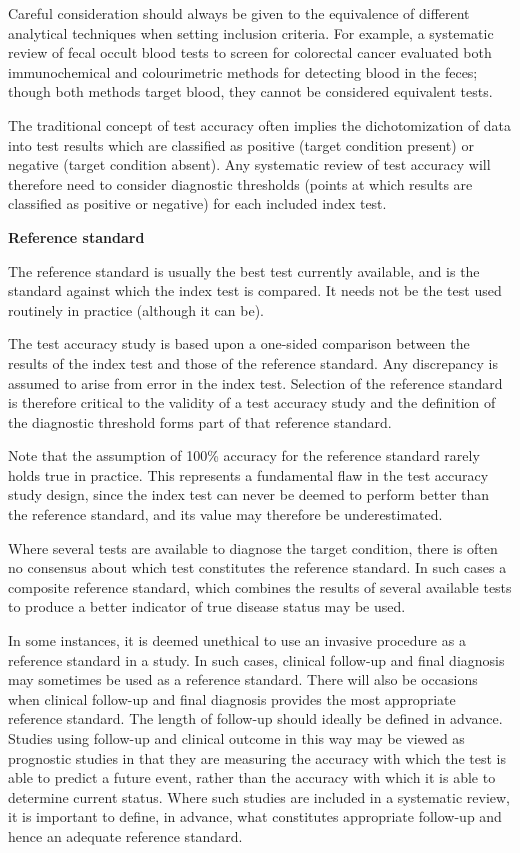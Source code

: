 \documentclass[
  11pt,
  a4paper,
  DIV=11,
  numbers=noendperiod]{scrreprt}
\begin{document}
Careful consideration should always be given to the equivalence of
different analytical techniques when setting inclusion criteria. For
example, a systematic review of fecal occult blood tests to screen for
colorectal cancer evaluated both immunochemical and colourimetric
methods for detecting blood in the feces; though both methods target
blood, they cannot be considered equivalent tests.

The traditional concept of test accuracy often implies the
dichotomization of data into test results which are classified as
positive (target condition present) or negative (target condition
absent). Any systematic review of test accuracy will therefore need to
consider diagnostic thresholds (points at which results are classified
as positive or negative) for each included index test.

\textbf{Reference standard}

The reference standard is usually the best test currently available, and
is the standard against which the index test is compared. It needs not
be the test used routinely in practice (although it can be).

The test accuracy study is based upon a one-sided comparison between the
results of the index test and those of the reference standard. Any
discrepancy is assumed to arise from error in the index test. Selection
of the reference standard is therefore critical to the validity of a
test accuracy study and the definition of the diagnostic threshold forms
part of that reference standard.

Note that the assumption of 100\% accuracy for the reference standard
rarely holds true in practice. This represents a fundamental flaw in the
test accuracy study design, since the index test can never be deemed to
perform better than the reference standard, and its value may therefore
be underestimated.

Where several tests are available to diagnose the target condition,
there is often no consensus about which test constitutes the reference
standard. In such cases a composite reference standard, which combines
the results of several available tests to produce a better indicator of
true disease status may be used.

In some instances, it is deemed unethical to use an invasive procedure
as a reference standard in a study. In such cases, clinical follow-up
and final diagnosis may sometimes be used as a reference standard. There
will also be occasions when clinical follow-up and final diagnosis
provides the most appropriate reference standard. The length of
follow-up should ideally be defined in advance. Studies using follow-up
and clinical outcome in this way may be viewed as prognostic studies in
that they are measuring the accuracy with which the test is able to
predict a future event, rather than the accuracy with which it is able
to determine current status. Where such studies are included in a
systematic review, it is important to define, in advance, what
constitutes appropriate follow-up and hence an adequate reference
standard.
\end{document}
